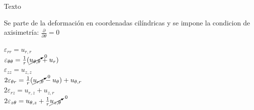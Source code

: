 \documentclass[10pt]{beamer}
\begin{document}
\begin{frame}{Texto}

Se parte de la deformación en coordenadas cilíndricas y se impone la condicion de axisimetría: $\frac{\partial}{\partial\theta}=0$\\
\vspace{0.6cm}

$\varepsilon_{rr} = u_{r,r}$\\
$\varepsilon_{\theta\theta} = \frac{1}{r}(\cancelto{0}{u_{\theta,\theta}}+ u_{r})$\\
$\varepsilon_{zz} = u_{z,z}$\\
$2\varepsilon_{\theta r} = \frac{1}{r}(\cancelto{0}{u_{r,\theta}}-u_{\theta})+u_{\theta,r}$\\
$2\varepsilon_{rz} = u_{r,z} + u_{z,r} $\\
$2\varepsilon_{z\theta} = u_{\theta,z}+\frac{1}{r}\cancelto{0}{u_{z,\theta}}$\\
\vspace{0.3cm}



\end{frame}
\end{document}
